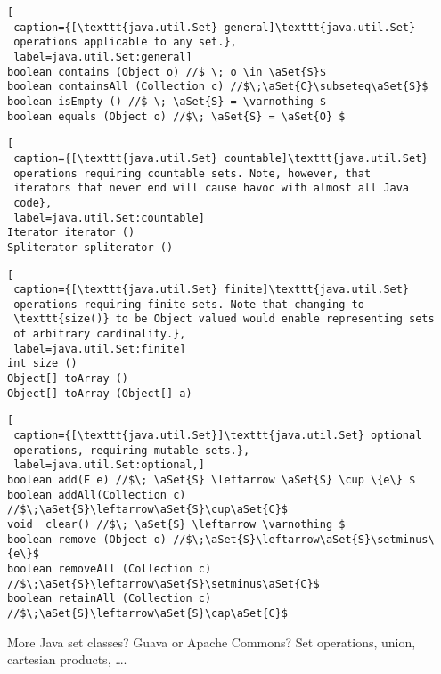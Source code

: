 \begin{lstlisting}[
 caption={[\texttt{java.util.Set} general]\texttt{java.util.Set} 
 operations applicable to any set.}, 
 label=java.util.Set:general]
boolean contains (Object o) //$ \; o \in \aSet{S}$
boolean containsAll (Collection c) //$\;\aSet{C}\subseteq\aSet{S}$ 
boolean isEmpty () //$ \; \aSet{S} = \varnothing $
boolean equals (Object o) //$\; \aSet{S} = \aSet{O} $
\end{lstlisting}
\begin{lstlisting}[
 caption={[\texttt{java.util.Set} countable]\texttt{java.util.Set} 
 operations requiring countable sets. Note, however, that 
 iterators that never end will cause havoc with almost all Java
 code}, 
 label=java.util.Set:countable]
Iterator iterator ()
Spliterator spliterator ()
\end{lstlisting}
\begin{lstlisting}[
 caption={[\texttt{java.util.Set} finite]\texttt{java.util.Set} 
 operations requiring finite sets. Note that changing to
 \texttt{size()} to be Object valued would enable representing sets
 of arbitrary cardinality.}, 
 label=java.util.Set:finite] 
int size () 
Object[] toArray ()
Object[] toArray (Object[] a)
\end{lstlisting}
\begin{lstlisting}[
 caption={[\texttt{java.util.Set}]\texttt{java.util.Set} optional
 operations, requiring mutable sets.}, 
 label=java.util.Set:optional,]
boolean add(E e) //$\; \aSet{S} \leftarrow \aSet{S} \cup \{e\} $
boolean addAll(Collection c) //$\;\aSet{S}\leftarrow\aSet{S}\cup\aSet{C}$ 
void  clear() //$\; \aSet{S} \leftarrow \varnothing $ 
boolean remove (Object o) //$\;\aSet{S}\leftarrow\aSet{S}\setminus\{e\}$
boolean removeAll (Collection c) //$\;\aSet{S}\leftarrow\aSet{S}\setminus\aSet{C}$ 
boolean retainAll (Collection c) //$\;\aSet{S}\leftarrow\aSet{S}\cap\aSet{C}$
\end{lstlisting}

More Java set classes? Guava or Apache Commons?
Set operations, union, cartesian products, \ldots.

\lstset{language=Clojure}


